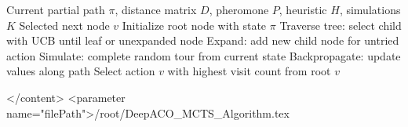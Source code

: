 \begin{algorithm}[H]
\caption{MCTS Selection for Next Node}
\label{alg:mcts_selection}
\begin{algorithmic}[1]
\Require Current partial path $\pi$, distance matrix $D$, pheromone $P$, heuristic $H$, simulations $K$
\Ensure Selected next node $v$
\State Initialize root node with state $\pi$
    \State Traverse tree: select child with UCB until leaf or unexpanded node
    \State Expand: add new child node for untried action
    \State Simulate: complete random tour from current state
    \State Backpropagate: update values along path
\EndFor
\State Select action $v$ with highest visit count from root
\State \Return $v$
\end{algorithmic}
\end{algorithm}</content>
<parameter name="filePath">/root/DeepACO_MCTS_Algorithm.tex